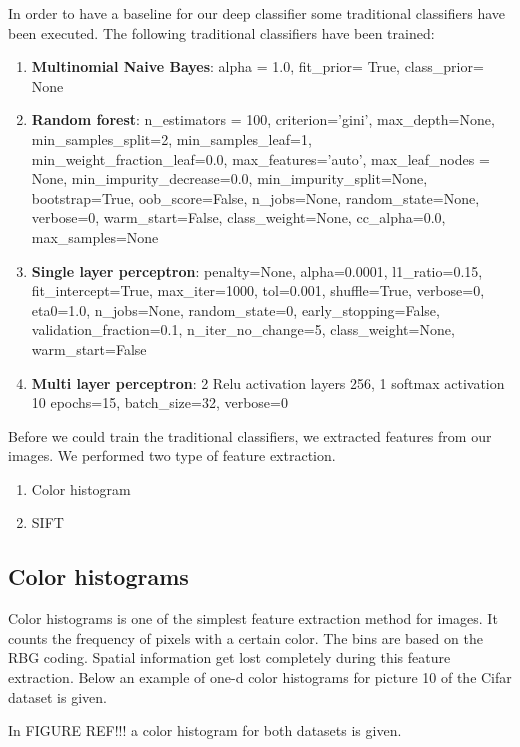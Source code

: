 \documentclass[11pt]{article}
\begin{document}
In order to have a baseline for our deep classifier some traditional classifiers have been executed. The following traditional classifiers have been trained:
\begin{enumerate}
\item{\textbf{Multinomial Naive Bayes}: alpha = 1.0, fit\_prior= True, class\_prior= None }
\item{\textbf{Random forest}: n\_estimators = 100, criterion='gini', max\_depth=None, min\_samples\_split=2, min\_samples\_leaf=1, min\_weight\_fraction\_leaf=0.0, max\_features='auto', max\_leaf\_nodes = None, min\_impurity\_decrease=0.0, min\_impurity\_split=None, bootstrap=True, oob\_score=False, n\_jobs=None, random\_state=None, verbose=0, warm\_start=False, class\_weight=None, cc\_alpha=0.0, max\_samples=None}
\item{\textbf{Single layer perceptron}:  penalty=None, alpha=0.0001, l1\_ratio=0.15, fit\_intercept=True, max\_iter=1000, tol=0.001, shuffle=True, verbose=0, eta0=1.0, n\_jobs=None, random\_state=0, early\_stopping=False, validation\_fraction=0.1, n\_iter\_no\_change=5, class\_weight=None, warm\_start=False}
\item{\textbf{Multi layer perceptron}: 2 Relu activation layers 256, 1 softmax activation 10  epochs=15, batch\_size=32, verbose=0}

\end{enumerate}

Before we could train the traditional classifiers, we extracted features from our images. We performed two type of feature extraction. 

\begin{enumerate}
\item{Color histogram}
\item{SIFT}
\end{enumerate}

\subsection{Color histograms}
Color histograms is one of the simplest feature extraction method for images. It counts the frequency of pixels with a certain color. The bins are based on the RBG coding. Spatial information get lost completely during this feature extraction.
Below an example of one-d color histograms for picture 10 of the Cifar dataset is given.



In FIGURE REF!!! a color histogram for both datasets is given.
\end{document}
